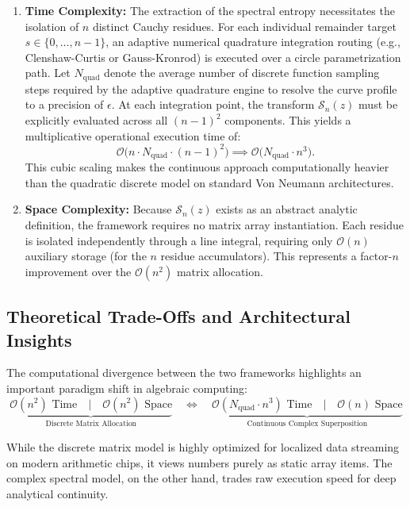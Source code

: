 \documentclass[11pt,twoside]{article}
\begin{document}
	\begin{enumerate}
		\item \textbf{Time Complexity:} The extraction of the spectral entropy necessitates the isolation of $n$ distinct Cauchy residues. For each individual remainder target $s \in \{0, \dots, n-1\}$, an adaptive numerical quadrature integration routing (e.g., Clenshaw-Curtis or Gauss-Kronrod) is executed over a circle parametrization path. Let $N_{\text{quad}}$ denote the average number of discrete function sampling steps required by the adaptive quadrature engine to resolve the curve profile to a precision of $\epsilon$. At each integration point, the transform $\mathcal{S}_n(z)$ must be explicitly evaluated across all $(n-1)^2$ components. This yields a multiplicative operational execution time of:
		\begin{equation}
			\mathcal{O}\Big(n \cdot N_{\text{quad}} \cdot (n-1)^2\Big) \implies \mathcal{O}\big(N_{\text{quad}} \cdot n^3\big).
		\end{equation}
		This cubic scaling makes the continuous approach computationally heavier than the quadratic discrete model on standard Von Neumann architectures.
		\item \textbf{Space Complexity:} Because $\mathcal{S}_n(z)$ exists as an abstract analytic definition, the framework requires no matrix array instantiation. Each residue is isolated independently through a line integral, requiring only $\mathcal{O}(n)$ auxiliary storage (for the $n$ residue accumulators). This represents a factor-$n$ improvement over the $\mathcal{O}(n^2)$ matrix allocation.
	\end{enumerate}
	
	\subsection{Theoretical Trade-Offs and Architectural Insights}
	The computational divergence between the two frameworks highlights an important paradigm shift in algebraic computing:
	\begin{equation}
		\underbrace{\mathcal{O}(n^2) \text{ Time} \quad \Big| \quad \mathcal{O}(n^2) \text{ Space}}_{\text{Discrete Matrix Allocation}} \quad \Longleftrightarrow \quad \underbrace{\mathcal{O}(N_{\text{quad}} \cdot n^3) \text{ Time} \quad \Big| \quad \mathcal{O}(n) \text{ Space}}_{\text{Continuous Complex Superposition}}
	\end{equation}
	
	While the discrete matrix model is highly optimized for localized data streaming on modern arithmetic chips, it views numbers purely as static array items. The complex spectral model, on the other hand, trades raw execution speed for deep analytical continuity. 
	
\end{document}
